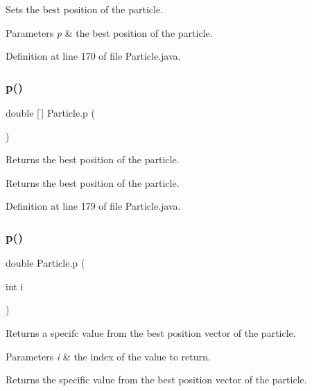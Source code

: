 Sets the best position of the particle. 
\begin{DoxyParams}{Parameters}
{\em p} & the best position of the particle. \\
\hline
\end{DoxyParams}


Definition at line 170 of file Particle.\+java.

\mbox{\label{class_particle_add309fe038f8b01ffd812fd574dfeed9}} 
\subsubsection{\texorpdfstring{p()}{p()}\hspace{0.1cm}{\footnotesize\ttfamily [2/3]}}
{\footnotesize\ttfamily double \mbox{[}$\,$\mbox{]} Particle.\+p (\begin{DoxyParamCaption}{ }\end{DoxyParamCaption})}

Returns the best position of the particle. \begin{DoxyReturn}{Returns}
the best position of the particle. 
\end{DoxyReturn}


Definition at line 179 of file Particle.\+java.

\mbox{\label{class_particle_a3ffe07f8456b8f145631fe6e9ae01909}} 
\subsubsection{\texorpdfstring{p()}{p()}\hspace{0.1cm}{\footnotesize\ttfamily [3/3]}}
{\footnotesize\ttfamily double Particle.\+p (\begin{DoxyParamCaption}\item[{int}]{i }\end{DoxyParamCaption})}

Returns a specifc value from the best position vector of the particle. 
\begin{DoxyParams}{Parameters}
{\em i} & the index of the value to return. \\
\hline
\end{DoxyParams}
\begin{DoxyReturn}{Returns}
the specific value from the best position vector of the particle. 
\end{DoxyReturn}


